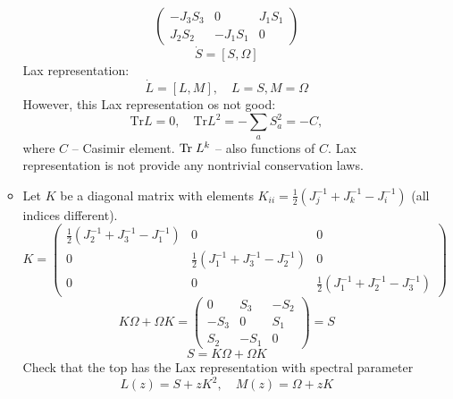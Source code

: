 \documentclass[12pt]{article}
\theoremstyle{definition}
\begin{document}
\begin{enumerate}
\begin{itemize}
\begin{equation}
\begin{pmatrix}
                -J_3S_3 & 0 & J_1S_1\\
                J_2S_2 & -J_1S_1 & 0
            \end{pmatrix}
        \end{equation}
        \begin{equation}
            \boxed{\dot{S}=[S,\Omega]}
        \end{equation}
        Lax representation:
        \begin{equation}
            \dot{L}=[L,M],\quad L=S, M=\Omega
        \end{equation}
        However, this Lax representation os not good:
        \begin{equation}
            \text{Tr}L=0,\quad\text{Tr}L^2=-\sum\limits_aS_a^2=-C,
        \end{equation}
        where $C$ -- Casimir element. $\text{Tr\;} L^k$ -- also functions of $C$. Lax representation is not provide any nontrivial conservation laws. 
        \item Let $K$ be a diagonal matrix with elements $K_{ii} = \frac{1}{2}(J^{-1}_j + J^{-1}_k-J^{-1}_i)$ (all indices different).
        \begin{equation}
            K=\begin{pmatrix}
                \frac{1}{2}(J_2^{-1}+J_3^{-1}-J_1^{-1}) & 0 & 0\\
                0 & \frac{1}{2}(J_1^{-1}+J_3^{-1}-J_2^{-1}) & 0\\
                0 & 0 & \frac{1}{2}(J_1^{-1}+J_2^{-1}-J_3^{-1})
            \end{pmatrix}
        \end{equation}
        \begin{equation}
            K\Omega+\Omega K=\begin{pmatrix}
                0 & S_3 & -S_2\\
                -S_3 & 0 & S_1\\
                S_2 & -S_1 & 0
            \end{pmatrix}=S
        \end{equation}
        \begin{equation}
            \boxed{S=K\Omega+\Omega K}
        \end{equation}
        Check that the top has the Lax representation with spectral parameter
        \begin{equation}
            L(z)=S+zK^2,\quad M(z)=\Omega+zK
        \end{equation}

\end{itemize}
\end{enumerate}
\end{document}

